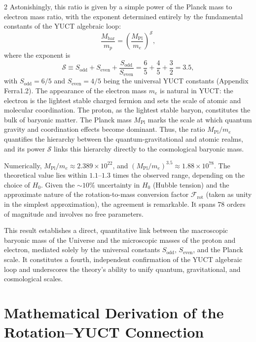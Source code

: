 \documentclass[12pt,a4paper]{article}
\newcommand{\Sodd}{S_{\mathrm{odd}}}
\newcommand{\Seven}{S_{\mathrm{even}}}
\begin{document}
\begin{multicols}{2}
		Astonishingly, this ratio is given by a simple power of the Planck mass to electron mass ratio, with the exponent determined entirely by the fundamental constants of the YUCT algebraic loop:
		\begin{equation}
			\boxed{ \frac{M_{\mathrm{bar}}}{m_p} = \left( \frac{M_{\mathrm{Pl}}}{m_e} \right)^{\mathcal{S}} },
			\label{eq:baryon-hierarchy}
		\end{equation}
		where the exponent is
		\begin{equation}
			\mathcal{S} \equiv \Sodd + \Seven + \frac{\Sodd}{\Seven} = \frac{6}{5} + \frac{4}{5} + \frac{3}{2} = 3.5,
		\end{equation}
		with \(\Sodd = 6/5\) and \(\Seven = 4/5\) being the universal YUCT constants (Appendix Ferra1.2). The appearance of the electron mass \(m_e\) is natural in YUCT: the electron is the lightest stable charged fermion and sets the scale of atomic and molecular coordination. The proton, as the lightest stable baryon, constitutes the bulk of baryonic matter. The Planck mass \(M_{\mathrm{Pl}}\) marks the scale at which quantum gravity and coordination effects become dominant. Thus, the ratio \(M_{\mathrm{Pl}}/m_e\) quantifies the hierarchy between the quantum-gravitational and atomic realms, and its power \(\mathcal{S}\) links this hierarchy directly to the cosmological baryonic mass.
		
		Numerically, \(M_{\mathrm{Pl}}/m_e \approx 2.389 \times 10^{22}\), and \((M_{\mathrm{Pl}}/m_e)^{3.5} \approx 1.88 \times 10^{78}\). The theoretical value lies within \(1.1\)--\(1.3\) times the observed range, depending on the choice of \(H_0\). Given the \(\sim 10\%\) uncertainty in \(H_0\) (Hubble tension) and the approximate nature of the rotation-to-mass conversion factor \(\mathcal{F}_{\mathrm{rot}}\) (taken as unity in the simplest approximation), the agreement is remarkable. It spans 78 orders of magnitude and involves no free parameters.
		
		This result establishes a direct, quantitative link between the macroscopic baryonic mass of the Universe and the microscopic masses of the proton and electron, mediated solely by the universal constants \(\Sodd\), \(\Seven\), and the Planck scale. It constitutes a fourth, independent confirmation of the YUCT algebraic loop and underscores the theory's ability to unify quantum, gravitational, and cosmological scales.
		
		\section{Mathematical Derivation of the Rotation–YUCT Connection}
		\label{sec:rotation-yuct}
		

\end{multicols}
\end{document}
